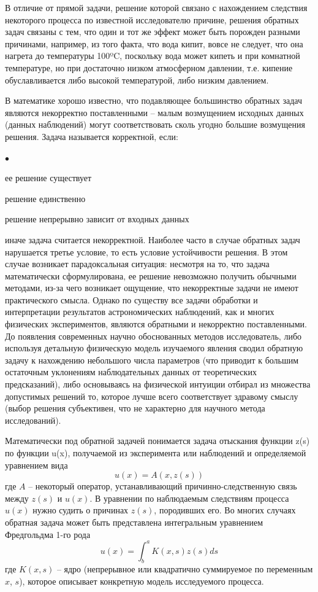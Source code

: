 \documentclass[12pt, a4paper]{article}
\newenvironment{compactlist}{
    \begin{list}{{$\bullet$}}{
      \setlength\partopsep{0pt}
      \setlength\parskip{0pt}
      \setlength\parsep{0pt}
      \setlength\topsep{0pt}
      \setlength\itemsep{0pt}
} }{
\end{list} }
\begin{document}
	В отличие от прямой задачи, решение которой связано с нахождением следствия некоторого процесса по известной исследователю причине, решения обратных задач связаны с тем, что один и тот же эффект может быть порожден разными причинами, например, из того факта, что вода кипит, вовсе не следует, что она нагрета до температуры 100ºC, поскольку вода может кипеть и при комнатной температуре, но при достаточно низком атмосферном давлении, т.е. кипение обуславливается либо высокой температурой, либо низким давлением.

	В математике хорошо известно, что подавляющее большинство обратных задач являются некорректно поставленными – малым возмущением исходных данных (данных наблюдений) могут соответствовать сколь угодно большие возмущения решения. Задача называется корректной, если:
	\begin{compactlist}
	\item ее решение существует
	\item решение единственно
	\item решение непрерывно зависит от входных данных
	\end{compactlist}

	иначе задача считается некорректной. Наиболее часто в случае обратных задач нарушается третье условие, то есть условие устойчивости решения. В этом случае возникает парадоксальная ситуация: несмотря на то, что задача математически сформулирована, ее решение невозможно получить обычными методами, из-за чего возникает ощущение, что некорректные задачи не имеют практического смысла. Однако по существу все задачи обработки и интерпретации результатов астрономических наблюдений, как и многих физических экспериментов, являются обратными и некорректно поставленными. До появления современных научно обоснованных методов исследователь, либо используя детальную физическую модель изучаемого явления сводил обратную задачу к нахождению небольшого числа параметров (что приводит к большим остаточным уклонениям наблюдательных данных от теоретических предсказаний), либо основываясь на физической интуиции отбирал из множества допустимых решений то, которое лучше всего соответствует здравому смыслу (выбор решения субъективен, что не характерно для научного метода исследований).
	
	Математически под обратной задачей понимается задача отыскания функции z(s) по функции u(x), получаемой из эксперимента или наблюдений и определяемой уравнением вида
	$$
	u(x)=A(x,z(s))
	$$
	где $A$ – некоторый оператор, устанавливающий причинно-следственную связь между $z(s)$ и $u(x)$. В уравнении по наблюдаемым следствиям процесса $u(x)$ нужно судить о причинах $z(s)$, породивших его.
	Во многих случаях обратная задача может быть представлена интегральным уравнением Фредгольдма 1-го рода
	$$
	u(x) = \int^a_b K(x, s)z(s) ds
	$$
	где $K(x, s)$ – ядро (непрерывное или квадратично суммируемое по переменным $x$, $s$), которое описывает конкретную модель исследуемого процесса.
	
\end{document}
